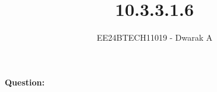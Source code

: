 \documentclass[journal]{IEEEtran}
\begin{document}

\vspace{3cm}

\title{10.3.3.1.6}
\author{EE24BTECH11019 - Dwarak A}
{\let\newpage\relax\maketitle}

\renewcommand{\thefigure}{\theenumi}
\renewcommand{\thetable}{\theenumi}
\setlength{\intextsep}{10pt} %


\renewcommand{\thetable}{\theenumi}

\textbf{Question:}
\end{document}
